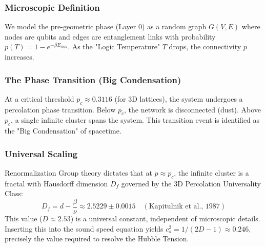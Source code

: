 \documentclass[a4paper,12pt]{article}
\begin{document}
\subsubsection{Microscopic Definition}
We model the pre-geometric phase (Layer 0) as a random graph $G(V, E)$ where nodes are qubits and edges are entanglement links with probability $p(T) = 1 - e^{-\beta E_{link}}$.
As the "Logic Temperature" $T$ drops, the connectivity $p$ increases.

\subsubsection{The Phase Transition (Big Condensation)}
At a critical threshold $p_c \approx 0.3116$ (for 3D lattices), the system undergoes a percolation phase transition. Below $p_c$, the network is disconnected (dust). Above $p_c$, a single infinite cluster spans the system. This transition event is identified as the "Big Condensation" of spacetime.

\subsubsection{Universal Scaling}
Renormalization Group theory dictates that at $p \approx p_c$, the infinite cluster is a fractal with Hausdorff dimension $D_f$ governed by the 3D Percolation Universality Class:
\begin{equation}
    D_f = d - \frac{\beta}{\nu} \approx 2.5229 \pm 0.0015 \quad (\text{Kapitulnik et al., 1987})
\end{equation}
This value ($D \approx 2.53$) is a universal constant, independent of microscopic details. Inserting this into the sound speed equation yields $c_s^2 = 1/(2D-1) \approx 0.246$, precisely the value required to resolve the Hubble Tension.




\end{document}
